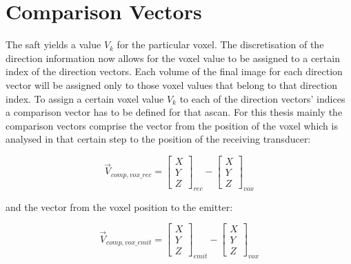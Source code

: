 \section{Comparison Vectors}
\label{sec:comp_vect}

The \ac{saft} yields a value $V_k$ for the particular voxel. The discretisation of the direction information now allows for the voxel value to be assigned to a certain index of the direction vectors. Each volume of the final image for each direction vector will be assigned only to those voxel values that belong to that direction index.
To assign a certain voxel value $V_k$ to each of the direction vectors' indices a comparison vector has to be defined for that \ac{ascan}. For this thesis mainly the comparison vectors comprise the vector from the position of the voxel which is analysed in that certain step to the position of the receiving transducer:

\begin{equation}
\vec{V}_{comp,vox\_rec} = \begin{bmatrix}
X
\\
Y 
\\
Z 
\end{bmatrix}_{rec}
-
\begin{bmatrix}
X
\\
Y 
\\
Z 
\end{bmatrix}_{vox}
\label{comp_vect}
\end{equation}

and the vector from the voxel position to the emitter:

\begin{equation}
\vec{V}_{comp,vox\_emit} = \begin{bmatrix}
X
\\
Y 
\\
Z 
\end{bmatrix}_{emit}
-
\begin{bmatrix}
X
\\
Y 
\\
Z 
\end{bmatrix}_{vox}
\label{comp_vec2t}
\end{equation}

